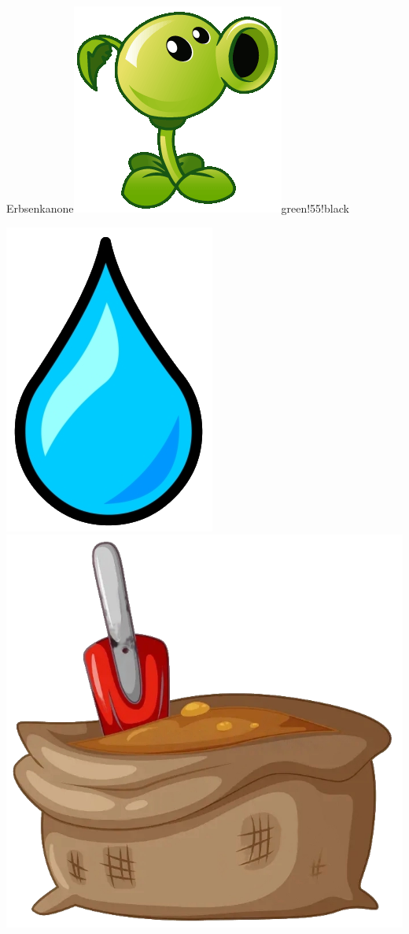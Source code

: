 \documentclass[11pt, a5paper]{article}
\def\now{\hspace{0.2cm}}
\begin{document}
\begin{mybox}{Erbsenkanone}{\includegraphics[scale=0.1]{pea}}{green!55!black}
\begin{minipage}[t]{\textwidth}
			\now\includegraphics[scale=0.3]{water} 
			\now\includegraphics[scale=0.04]{dirt} 

\end{minipage}
\end{mybox}
\end{document}
